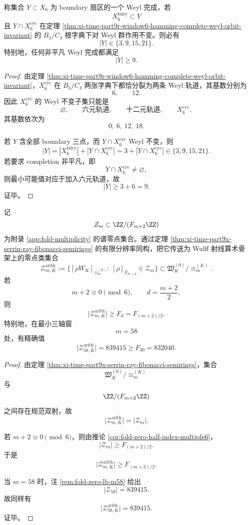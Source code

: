 \begin{theorem}\label{thm:xi-time-part9x-window6-boundary-weyl-threshold}
称集合 \(Y\subset X_6\) 为 boundary 扇区的一个 Weyl 完成，若
\[
X_6^{\mathrm{bdry}}\subset Y
\]
且 \(Y\cap X_6^{\mathrm{cyc}}\) 在定理 \ref{thm:xi-time-part9r-window6-hamming-complete-weyl-orbit-invariant} 的 \(B_3/C_3\) 根字典下对 Weyl 群作用不变。则必有
\[
|Y|\in\{3,9,15,21\}.
\]
特别地，任何非平凡 Weyl 完成都满足
\[
|Y|\ge 9.
\]
\end{theorem}
\begin{proof}
由定理 \ref{thm:xi-time-part9r-window6-hamming-complete-weyl-orbit-invariant}，\(X_6^{\mathrm{cyc}}\) 在 \(B_3/C_3\) 两张字典下都恰分裂为两条 Weyl 轨道，其基数分别为
\[
6,\qquad 12.
\]
因此 \(X_6^{\mathrm{cyc}}\) 的 Weyl 不变子集只能是
\[
\varnothing,
\qquad
\text{六元轨道},
\qquad
\text{十二元轨道},
\qquad
X_6^{\mathrm{cyc}},
\]
其基数依次为
\[
0,\ 6,\ 12,\ 18.
\]

若 \(Y\) 含全部 boundary 三点，而 \(Y\cap X_6^{\mathrm{cyc}}\) Weyl 不变，则
\[
|Y|
=
|X_6^{\mathrm{bdry}}|+|Y\cap X_6^{\mathrm{cyc}}|
=
3+|Y\cap X_6^{\mathrm{cyc}}|
\in
\{3,9,15,21\}.
\]
若要求 completion 非平凡，即
\[
Y\cap X_6^{\mathrm{cyc}}\neq\varnothing,
\]
则最小可能值对应于加入六元轨道，故
\[
|Y|\ge 3+6=9.
\]
证毕。
\end{proof}

\begin{theorem}\label{thm:xi-time-part9x-serrin-ray-arithmetic-zero-block}
记
\[
\mathcal Z_m\subset \ZZ/(F_{m+2}\ZZ)
\]
为附录 \ref{app:fold-multiplicity} 的谱零点集合。通过定理
\ref{thm:xi-time-part9x-serrin-ray-fibonacci-semirings} 的有限分辨率同构，把它传送为 Wulff 射线算术骨架上的零点类集合
\[
\mathcal Z_{m,K}^{\mathrm{arith}}
:=
\bigl\{[\rho W_K]_{\equiv_m^{(K)}}:\ [\rho]_{F_{m+2}}\in \mathcal Z_m\bigr\}
\subset
\mathfrak W_K^{(0)}/\!\equiv_m^{(K)}.
\]
若
\[
m+2\equiv 0\pmod 6,
\qquad
d=\frac{m+2}{2},
\]
则
\[
\bigl|\mathcal Z_{m,K}^{\mathrm{arith}}\bigr|
\ge
F_d
=
F_{(m+2)/2}.
\]
特别地，在最小三轴窗
\[
m=58
\]
处，有精确值
\[
\bigl|\mathcal Z_{58,K}^{\mathrm{arith}}\bigr|
=
839415
\ge
F_{30}=832040.
\]
\end{theorem}
\begin{proof}
由定理 \ref{thm:xi-time-part9x-serrin-ray-fibonacci-semirings}，集合
\[
\mathfrak W_K^{(0)}/\!\equiv_m^{(K)}
\]
与
\[
\ZZ/(F_{m+2}\ZZ)
\]
之间存在规范双射，故
\[
\bigl|\mathcal Z_{m,K}^{\mathrm{arith}}\bigr|
=
|\mathcal Z_m|.
\]

若 \(m+2\equiv 0\pmod 6\)，则由推论 \ref{cor:fold-zero-half-index-multiple6}，
\[
|\mathcal Z_m|
\ge
F_{(m+2)/2}.
\]
于是
\[
\bigl|\mathcal Z_{m,K}^{\mathrm{arith}}\bigr|
\ge
F_{(m+2)/2}.
\]

当 \(m=58\) 时，注 \ref{rem:fold-zero-lb-m58} 给出
\[
|\mathcal Z_{58}|=839415.
\]
故同样有
\[
\bigl|\mathcal Z_{58,K}^{\mathrm{arith}}\bigr|=839415.
\]
证毕。
\end{proof}


